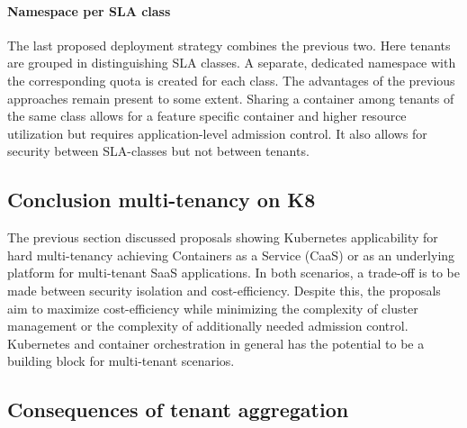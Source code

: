 \paragraph{Namespace per SLA class}
The last proposed deployment strategy combines the previous two. Here tenants are grouped in distinguishing SLA classes. A separate, dedicated namespace with the corresponding quota is created for each class. The advantages of the previous approaches remain present to some extent. Sharing a container among tenants of the same class allows for a feature specific container and higher resource utilization but requires application-level admission control. It also allows for security between SLA-classes but not between tenants.~\cite{TruyenEddy2016Taca} 
\subsection{Conclusion multi-tenancy on K8 }
The previous section discussed proposals showing Kubernetes applicability for hard multi-tenancy achieving Containers as a Service (CaaS) or as an underlying platform for multi-tenant SaaS applications. In both scenarios, a trade-off is to be made between security isolation and cost-efficiency. Despite this, the proposals aim to maximize cost-efficiency while minimizing the complexity of cluster management or the complexity of additionally needed admission control. Kubernetes and container orchestration in general has the potential to be a building block for multi-tenant scenarios.

\subsection{Consequences of tenant aggregation}

